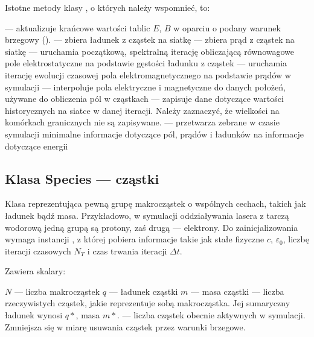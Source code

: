 Istotne metody klasy , o których należy wspomnieć, to:
\begin{itemize}
     \itemi{}  --- aktualizuje krańcowe wartości tablic $E$, $B$
         w oparciu o podany warunek brzegowy ().
     \itemi{}  --- zbiera ładunek z cząstek na siatkę
     \itemi{}  --- zbiera prąd z cząstek na siatkę
     \itemi{}  --- uruchamia początkową, spektralną iterację obliczającą równowagowe
           pole elektrostatyczne na podstawie gęstości ładunku z cząstek
     \itemi{}  --- uruchamia iterację ewolucji czasowej pola elektromagnetycznego na podstawie
           prądów w symulacji
     \itemi{}  --- interpoluje pola elektryczne i magnetyczne do danych położeń, używane
           do obliczenia pól w cząstkach
     \itemi{}  --- zapisuje dane dotyczące wartości historycznych na siatce w danej iteracji.
           Należy zaznaczyć, że wielkości na komórkach granicznych nie są zapisywane.
     \itemi{}  --- przetwarza zebrane w czasie symulacji minimalne informacje dotyczące pól, prądów i ładunków
           na informacje dotyczące energii
\end{itemize}

\subsection{Klasa Species --- cząstki}
Klasa reprezentująca pewną grupę makrocząstek o wspólnych cechach, takich
jak ładunek bądź masa.  Przykładowo, w symulacji oddziaływania lasera z
tarczą wodorową jedną grupą są protony, zaś drugą --- elektrony.  Do
zainicjalizowania wymaga instancji , z której pobiera informacje
takie jak stałe fizyczne $c$, $\varepsilon_0$, liczbę iteracji czasowych
$N_T$ i czas trwania iteracji $\Delta t$.

Zawiera skalary:
\begin{itemize}
    \itemi{} $N$ --- liczba makrocząstek
    \itemi{} $q$ --- ładunek cząstki
    \itemi{} $m$ --- masa cząstki
    \itemi{}  --- liczba rzeczywistych cząstek, jakie reprezentuje
        sobą makrocząstka. Jej sumaryczny ładunek wynosi $q *
        $, masa $m * $.
    \itemi{}  --- liczba cząstek obecnie aktywnych w symulacji.
        Zmniejsza się w miarę usuwania cząstek przez warunki brzegowe.
\end{itemize}

